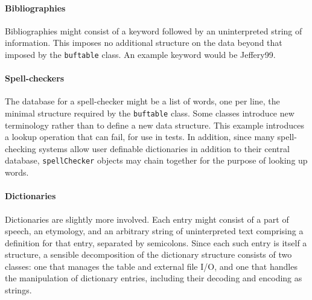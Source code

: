 \paragraph{Bibliographies}
Bibliographies might consist of a keyword followed by an uninterpreted
string of information. This imposes no additional structure on the data
beyond that imposed by the \texttt{buftable} class. An example keyword
would be Jeffery99. 


\paragraph{Spell-checkers}
The database for a spell-checker might be a list of words, one per
line, the minimal structure required by the \texttt{buftable} class.
Some classes introduce new terminology rather
than to define a new data structure. This example introduces a lookup
operation that can fail, for use in tests. In addition, since many
spell-checking systems allow user definable dictionaries in addition to
their central database, \texttt{spellChecker} objects may chain
together for the purpose of looking up words. 


\paragraph{Dictionaries}
Dictionaries are slightly more involved. Each entry might consist of a
part of speech, an etymology, and an arbitrary string of uninterpreted
text comprising a definition for that entry, separated by semicolons.
Since each such entry is itself a structure, a sensible decomposition
of the dictionary structure consists of two classes: one that manages
the table and external file I/O, and one that handles the manipulation
of dictionary entries, including their decoding and encoding as
strings. 

